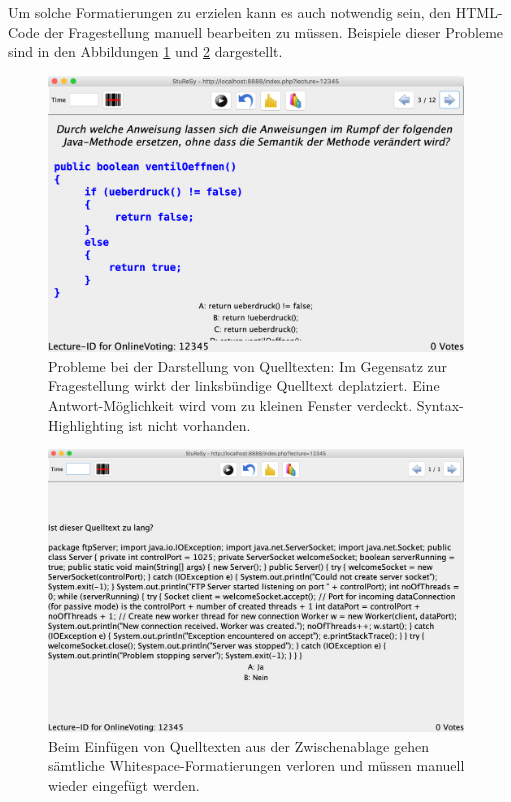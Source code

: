 Um solche Formatierungen zu erzielen kann es auch notwendig sein, den HTML-Code der Fragestellung manuell bearbeiten zu müssen. Beispiele dieser Probleme sind in den Abbildungen \ref{abb:sturesy_problem_1} und \ref{abb:sturesy_problem_3} dargestellt.


\begin{figure}[H]
    \includegraphics[width=11cm]{chapter/bewertung/bilder/StuReSy_Problem_2.png}
    \centering
    \caption[Probleme bei der Darstellung von Quelltexten in StuReSy (2)]{Probleme bei der Darstellung von Quelltexten: Im Gegensatz zur Fragestellung wirkt der linksbündige Quelltext deplatziert. Eine Antwort-Möglichkeit wird vom zu kleinen Fenster verdeckt. Syntax-Highlighting ist nicht vorhanden.}
    \label{abb:sturesy_problem_1}
\end{figure}


\begin{figure}[H]
    \includegraphics[width=11cm]{chapter/bewertung/bilder/StuReSy_Problem_3.png}
    \centering
    \caption[Probleme bei der Darstellung von Quelltexten in StuReSy (3)]{Beim Einfügen von Quelltexten aus der Zwischenablage gehen sämtliche Whitespace-Formatierungen verloren und müssen manuell wieder eingefügt werden.}
    \label{abb:sturesy_problem_3}
\end{figure}




